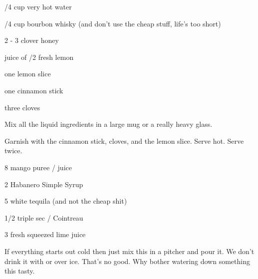 %
%
%
%
\newpage



\begin{IngredientsAndSteps}
    \ListIngredientsAndSteps
    {
        /4 cup very hot water

        /4 cup bourbon whisky (and don't use the cheap stuff, life's too short)

        2 - 3 \Tbl[s] clover honey

        juice of /2 fresh lemon

        one lemon slice

        one cinnamon stick

        three cloves
    }
    {
        Mix all the liquid ingredients in a large mug or a really heavy glass.

        Garnish with the cinnamon stick, cloves, and the lemon slice. Serve hot. Serve twice.
    }
\end{IngredientsAndSteps}

%
%
%
%
\newpage



\begin{IngredientsAndSteps}
    \ListIngredientsAndSteps
    {
        8 \Ounce mango puree / juice

        2 \Ounce Habanero Simple Syrup

        5 \Ounce white tequila (and not the cheap shit)

        1/2 \Ounce triple sec / Cointreau

        3 \Ounce fresh squeezed lime juice
    }
    {
        If everything starts out cold then just mix this in a pitcher and pour it. We don't drink
        it with or over ice. That's no good. Why bother watering down something this tasty.
    }
\end{IngredientsAndSteps}

